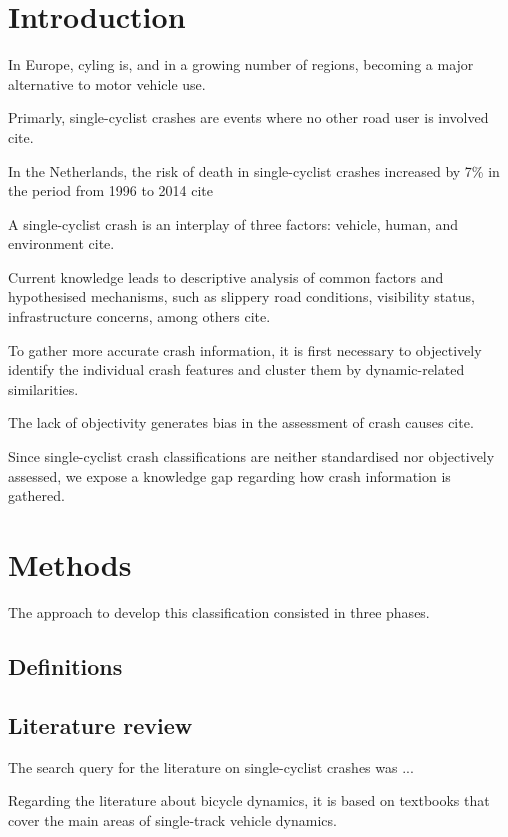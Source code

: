 \documentclass{article}
\begin{document}
\section{Introduction}

In Europe, cyling is, and in a growing number of regions, becoming a major alternative to motor vehicle use.

Primarly, single-cyclist crashes are events where no other road user is involved cite{}.

In the Netherlands, the risk of death in single-cyclist crashes increased by 7\% in the period from 1996 to 2014 cite{}

A single-cyclist crash is an interplay of three factors: vehicle, human, and environment cite{}.

Current knowledge leads to descriptive analysis of common factors and hypothesised mechanisms, such as slippery road conditions, visibility status, infrastructure concerns, among others cite{}.

To gather more accurate crash information, it is first necessary to objectively identify the individual crash features and cluster them by dynamic-related similarities.

The lack of objectivity generates bias in the assessment of crash causes cite{}.

Since single-cyclist crash classifications are neither standardised nor objectively assessed, we expose a knowledge gap regarding how crash information is gathered.


\section{Methods}

The approach to develop this classification consisted in three phases.

\subsection{Definitions}

\subsection{Literature review}

The search query for the literature on single-cyclist crashes was ...

Regarding the literature about bicycle dynamics, it is based on textbooks that cover the main areas of single-track vehicle dynamics.
\end{document}
